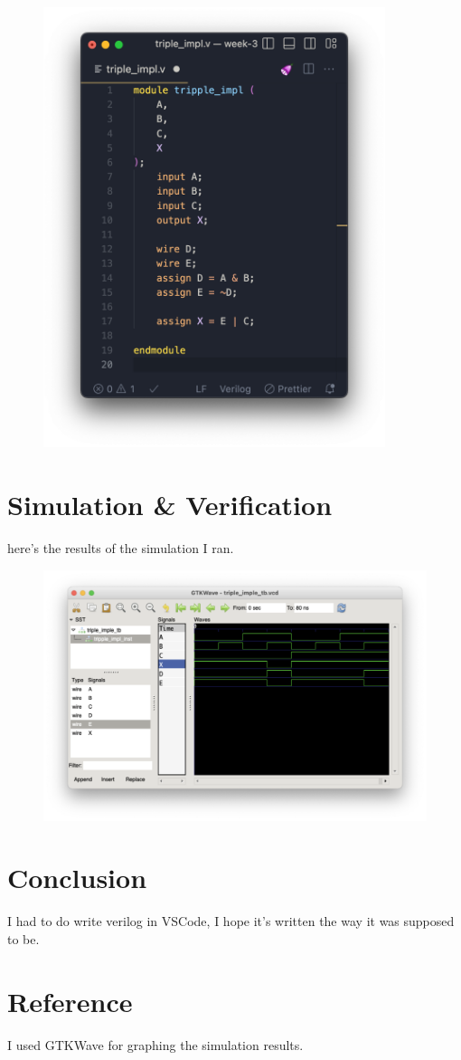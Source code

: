 \documentclass{article}
\begin{document}
    \begin{figure}[h]
        \includegraphics[width=10cm]{code-screenshot.png}
    \end{figure}
    
    \section*{Simulation \& Verification}

    here's the results of the simulation I ran.

    \begin{figure}[h]
        \includegraphics[width=12cm]{testing-screenshot.png}
    \end{figure}

    \section*{Conclusion}

    I had to do write verilog in VSCode, I hope it's written the way it was supposed to be.

    \section*{Reference}

    I used GTKWave for graphing the simulation results.
\end{document}
